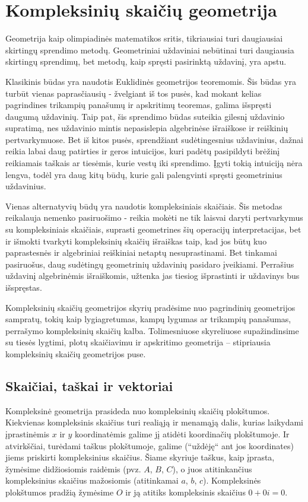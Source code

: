 \documentclass[11pt,a4paper,twoside]{book}
\begin{document}
\chapter {Kompleksinių skaičių geometrija}


Geometrija kaip olimpiadinės matematikos sritis, tikriausiai turi daugiausiai skirtingų sprendimo metodų. Geometriniai uždaviniai nebūtinai turi daugiausia skirtingų sprendimų, bet metodų, kaip spręsti pasirinktą uždavinį, yra apstu. 

Klasikinis būdas yra naudotis Euklidinės geometrijos teoremomis. Šis būdas yra turbūt vienas paprasčiausių - žvelgiant iš tos pusės, kad mokant kelias pagrindines trikampių panašumų ir apskritimų teoremas, galima išspręsti daugumą uždavinių. Taip pat, šis sprendimo būdas suteikia gilesnį uždavinio supratimą, nes uždavinio mintis nepasislepia algebrinėse išraiškose ir reiškinių pertvarkymuose. Bet iš kitos pusės, sprendžiant sudėtingesnius uždavinius, dažnai reikia labai daug patirties ir geros intuicijos, kuri padėtų pasipildyti brėžinį reikiamais taškais ar tiesėmis, kurie vestų iki sprendimo. Įgyti tokią intuiciją nėra lengva, todėl yra daug kitų būdų, kurie gali palengvinti spręsti geometrinius uždavinius.

Vienas alternatyvių būdų yra naudotis kompleksiniais skaičiais. Šis metodas reikalauja nemenko pasiruošimo - reikia mokėti ne tik laisvai daryti pertvarkymus su kompleksiniais skaičiais, suprasti geometrines šių operacijų interpretacijas, bet ir išmokti tvarkyti kompleksinių skaičių išraiškas taip, kad jos būtų kuo paprastesnės ir algebriniai reiškiniai netaptų nesuprastinami. Bet tinkamai pasiruošus, daug sudėtingų geometrinių uždavinių pasidaro įveikiami. Perrašius uždavinį algebrinėmis išraiškomis, užtenka jas tiesiog išprastinti ir uždavinys bus išspręstas. 

Kompleksinių skaičių geometrijos skyrių pradėsime nuo pagrindinių geometrijos
sampratų, tokių kaip lygiagretumas, kampų lygumas ar trikampių panašumas,
perrašymo kompleksinių skaičių kalba. Tolimesniuose skyreliuose supažindinsime
su tiesės lygtimi, plotų skaičiavimu ir apskritimo geometrija -- stipriausia
kompleksinių skaičių geometrijos puse.

\section{Skaičiai, taškai ir vektoriai}

Kompleksinė geometrija prasideda nuo kompleksinių skaičių plokštumos. Kiekvienas
kompleksinis skaičius turi realiąją ir menamąją dalis, kurias laikydami
įprastinėmis $x$ ir $y$ koordinatėmis galime jį atidėti koordinačių plokštumoje.
Ir atvirkščiai, turėdami taškus plokštumoje, galime (“uždėję“ ant jos
koordinates) jiems priskirti kompleksinius skaičius. Šiame skyriuje taškus, kaip
įprasta, žymėsime didžiosiomis raidėmis (pvz. $A$, $B$, $C$), o juos
atitinkančius kompleksinius skaičius mažosiomis (atitinkamai $a$, $b$, $c$).
Kompleksinės plokštumos pradžią žymėsime $O$ ir ją atitiks kompleksinis skaičius
$0 + 0i = 0$.
\end{document}
